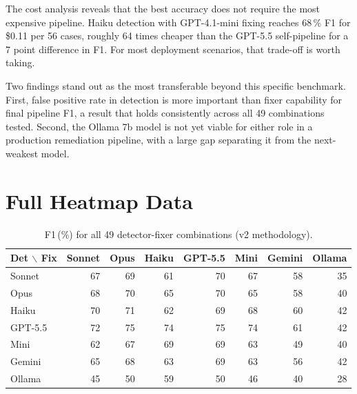 \documentclass[12pt]{article}
\begin{document}
The cost analysis reveals that the best accuracy does not require the most
expensive pipeline. Haiku detection with GPT-4.1-mini fixing reaches 68\,\%
F1 for \$0.11 per 56 cases, roughly 64 times cheaper than the GPT-5.5
self-pipeline for a 7 point difference in F1. For most deployment scenarios,
that trade-off is worth taking.

Two findings stand out as the most transferable beyond this specific
benchmark. First, false positive rate in detection is more important than
fixer capability for final pipeline F1, a result that holds consistently
across all 49 combinations tested. Second, the Ollama 7b model is not yet
viable for either role in a production remediation pipeline, with a large
gap separating it from the next-weakest model.

\newpage



\newpage
\appendix

\section{Full Heatmap Data}

\begin{table}[H]
  \centering
  \caption{F1\,(\%) for all 49 detector-fixer combinations (v2 methodology).}
  \label{tab:full-heatmap}
  \small
  \begin{tabular}{lrrrrrrr}
    \toprule
    Det $\backslash$ Fix & Sonnet & Opus & Haiku & GPT-5.5 & Mini & Gemini & Ollama \\
    \midrule
    Sonnet   & 67 & 69 & 61 & 70 & 67 & 58 & 35 \\
    Opus     & 68 & 70 & 65 & 70 & 65 & 58 & 40 \\
    Haiku    & 70 & 71 & 62 & 69 & 68 & 60 & 42 \\
    GPT-5.5  & 72 & 75 & 74 & 75 & 74 & 61 & 42 \\
    Mini     & 62 & 67 & 69 & 69 & 63 & 49 & 40 \\
    Gemini   & 65 & 68 & 63 & 69 & 63 & 56 & 42 \\
    Ollama   & 45 & 50 & 59 & 50 & 46 & 40 & 28 \\
    \bottomrule
  \end{tabular}
\end{table}
\end{document}
